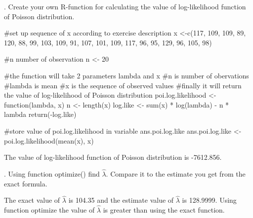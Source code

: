 \documentclass[12pt, oneside]{report}\usepackage[]{graphicx}\usepackage[]{color}
\begin{document}
. Create your own R-function for calculating the value of log-likelihood function of Poisson distribution.
\begin{Schunk}
\begin{Sinput}
#set up sequence of x according to exercise description
x <-c(117, 109, 109, 89, 120, 88, 99, 103, 109, 91, 107, 101, 109, 117, 96, 95, 129, 96, 105, 98)

#n number of observation
n <- 20

#the function will take 2 parameters lambda and x
#n is number of obervations
#lambda is mean
#x is the sequence of observed values
#finally it will return the value of log-likelihood of Poisson distribution
poi.log.likelihood <- function(lambda, x){
  n <- length(x)
  log.like <- sum(x) * log(lambda) - n * lambda
  return(-log.like)
}

#store value of poi.log.likelihood in variable ans.poi.log.like
ans.poi.log.like <- poi.log.likelihood(mean(x), x)
\end{Sinput}
\end{Schunk}
The value of log-likelihood function of Poisson distribution is -7612.856. \newline

. Using function optimize() find $\hat{\lambda}$. Compare it to the estimate you get from the exact formula.
\begin{Schunk}
\end{Schunk}
The exact value of $\hat{\lambda}$ is 104.35 and the estimate value of $\hat{\lambda}$ is 128.9999. \newline
Using function optimize the value of $\hat{\lambda}$ is greater than using the exact function. \newline
\end{document}
